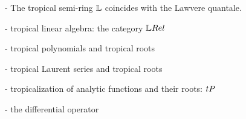 

- The tropical semi-ring $\mathbb{L}$ coincides with the Lawvere quantale.


- tropical linear algebra: the category $\LREL$


- tropical polynomials and tropical roots


- tropical Laurent series and tropical roots


- tropicalization of analytic functions and their roots: 
$\trop P$ 



- the differential operator 


